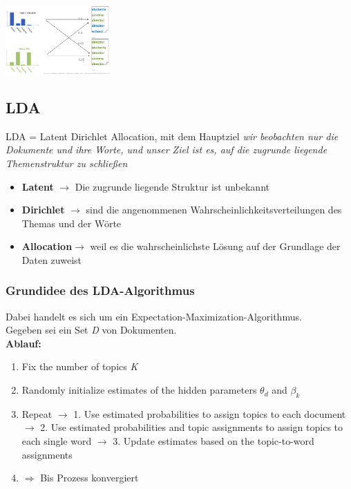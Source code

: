 \documentclass{article}
\newenvironment{Figure}
	{\par\medskip\noindent\minipage{\linewidth}}
	{\endminipage\par\medskip}
\theoremstyle{merke}
\theoremstyle{definition}
\begin{document}
        \begin{Figure}
        \centering
        \includegraphics[width=150px]{img/GenerativeProcessExample.png}
            \label{fig:Ein Beispiel für ein Generative Process}
        \end{Figure}

	    \subsection{LDA}
        LDA = Latent Dirichlet Allocation, mit dem Hauptziel \textit{wir beobachten nur die Dokumente und ihre Worte, und unser Ziel ist es, auf die zugrunde liegende Themenstruktur zu schließen}
        \begin{itemize}
            \item \textbf{Latent} $\rightarrow$ Die zugrunde liegende Struktur ist unbekannt
            \item \textbf{Dirichlet} $\rightarrow$ sind die angenommenen Wahrscheinlichkeitsverteilungen des Themas und der Wörte
            \item \textbf{Allocation}$\rightarrow$ weil es die wahrscheinlichste Lösung auf der Grundlage der Daten zuweist
        \end{itemize}

		    \subsubsection{Grundidee des LDA-Algorithmus}
            Dabei handelt es sich um ein Expectation-Maximization-Algorithmus.\\

            Gegeben sei ein Set \textit{D} von Dokumenten.\\
            \textbf{Ablauf:}
            \begin{enumerate}
                \item Fix the number of topics \textit{K}
                \item Randomly initialize estimates of the hidden parameters $\theta_d$ and $\beta_k$
                \item Repeat $\rightarrow$ 1. Use estimated probabilities to assign topics to each document $\rightarrow$ 2. Use estimated probabilities and topic assignments to assign topics to each single word $\rightarrow$ 3. Update estimates based on the topic-to-word assignments
                \item $\Rightarrow$ Bis Prozess konvergiert
            \end{enumerate}
\end{document}
